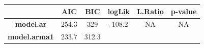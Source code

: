 \documentclass[]{article}
\begin{document}
\begin{longtable}[]{@{}cccccc@{}}
\toprule
\begin{minipage}[b]{0.21\columnwidth}\centering\strut
~
\strut\end{minipage} &
\begin{minipage}[b]{0.07\columnwidth}\centering\strut
AIC
\strut\end{minipage} &
\begin{minipage}[b]{0.07\columnwidth}\centering\strut
BIC
\strut\end{minipage} &
\begin{minipage}[b]{0.10\columnwidth}\centering\strut
logLik
\strut\end{minipage} &
\begin{minipage}[b]{0.12\columnwidth}\centering\strut
L.Ratio
\strut\end{minipage} &
\begin{minipage}[b]{0.12\columnwidth}\centering\strut
p-value
\strut\end{minipage}\tabularnewline
\midrule
\endhead
\begin{minipage}[t]{0.21\columnwidth}\centering\strut
\textbf{model.ar}
\strut\end{minipage} &
\begin{minipage}[t]{0.07\columnwidth}\centering\strut
254.3
\strut\end{minipage} &
\begin{minipage}[t]{0.07\columnwidth}\centering\strut
329
\strut\end{minipage} &
\begin{minipage}[t]{0.10\columnwidth}\centering\strut
-108.2
\strut\end{minipage} &
\begin{minipage}[t]{0.12\columnwidth}\centering\strut
NA
\strut\end{minipage} &
\begin{minipage}[t]{0.12\columnwidth}\centering\strut
NA
\strut\end{minipage}\tabularnewline
\begin{minipage}[t]{0.21\columnwidth}\centering\strut
\textbf{model.arma1}
\strut\end{minipage} &
\begin{minipage}[t]{0.07\columnwidth}\centering\strut
233.7
\strut\end{minipage} &
\begin{minipage}[t]{0.07\columnwidth}\centering\strut
312.3
\strut\end{minipage} &
\begin{minipage}[t]{0.10\columnwidth}\centering\strut

\end{minipage}
\end{longtable}
\end{document}
